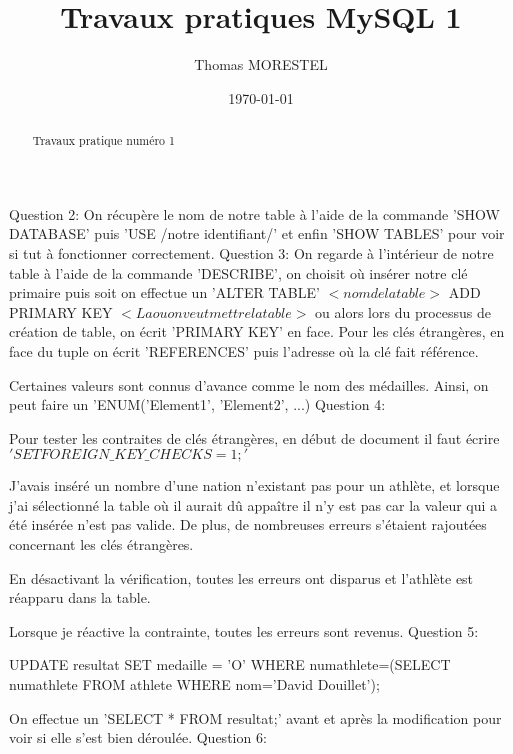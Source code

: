 \documentclass[a4paper, 12pt]{article}
\title{Travaux pratiques MySQL 1}
\author{Thomas MORESTEL}
\date{\today}
\begin{document}
\maketitle

\begin{abstract}

Travaux pratique numéro 1

\end{abstract}

\newpage

Question 2:
On récupère le nom de notre table à l'aide de la commande 'SHOW DATABASE' puis 'USE /notre identifiant/' et enfin 'SHOW TABLES' pour voir si tut à fonctionner correctement.
\newline
Question 3:
On regarde à l'intérieur de notre table à l'aide de la commande 'DESCRIBE', on choisit où insérer notre clé primaire puis soit on effectue un 'ALTER TABLE' $<nom de la table>$ ADD PRIMARY KEY $<La ou on veut mettre la table>$ ou alors lors du processus de création de table, on écrit 'PRIMARY KEY' en face.
\newline
Pour les clés étrangères, en face du tuple on écrit 'REFERENCES' puis l'adresse où la clé fait référence.

Certaines valeurs sont connus d'avance comme le nom des médailles. Ainsi, on peut faire un 'ENUM('Element1', 'Element2', ...) 
\newline
Question 4:

Pour tester les contraites de clés étrangères, en début de document il faut écrire $'SET  FOREIGN\_KEY\_CHECKS=1;'$

J'avais inséré un nombre d'une nation n'existant pas pour un athlète, et lorsque j'ai sélectionné la table où il aurait dû appaître il n'y est pas car la valeur qui a été insérée n'est pas valide. De plus, de nombreuses erreurs s'étaient rajoutées concernant les clés étrangères.

En désactivant la vérification, toutes les erreurs ont disparus et l'athlète est réapparu dans la table.

Lorsque je réactive la contrainte, toutes les erreurs sont revenus. 
\newline
Question 5:

UPDATE resultat
SET medaille = 'O'
WHERE numathlete=(SELECT numathlete FROM athlete WHERE nom='David Douillet');

On effectue un 'SELECT * FROM resultat;' avant et après la modification pour voir si elle s'est bien déroulée.
\newline
Question 6:
\end{document}
